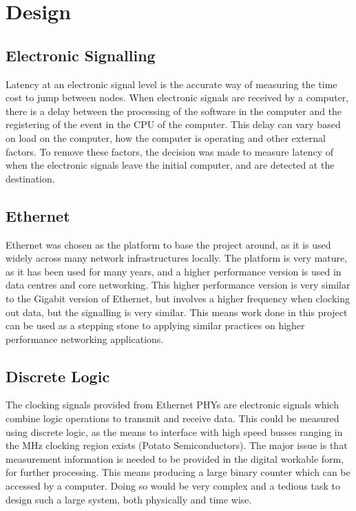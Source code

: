 \chapter{Design}\label{C:design}

\section{Electronic Signalling}

\par Latency at an electronic signal level is the accurate way of measuring the time cost to jump between nodes. 
When electronic signals are received by a computer, there is a delay between the processing of the software 
in the computer and the registering of the event in the CPU of the computer. This delay can vary based on load 
on the computer, how the computer is operating and other external factors. To remove these factors, the decision 
was made to measure latency of when the electronic signals leave the initial computer, and are detected at the 
destination.

\section{Ethernet}

Ethernet was chosen as the platform to base the project around, as it is used widely across many network 
infrastructures locally. The platform is very mature, as it has been used for many years, and a higher performance 
version is used in data centres and core networking. This higher performance version is very similar to the Gigabit 
version of Ethernet, but involves a higher frequency when clocking out data, but the signalling is very similar. 
This means work done in this project can be used as a stepping stone to applying similar practices on higher 
performance networking applications.

\section{Discrete Logic}

The clocking signals provided from Ethernet PHYs are electronic signals which combine logic operations to transmit 
and receive data. This could be measured using discrete logic, as the means to interface with high speed busses 
ranging in the MHz clocking region exists (Potato Semiconductors). The major issue is that measurement information 
is needed to be provided in the digital workable form, for further processing.  This means producing a large binary 
counter which can be accessed by a computer. Doing so would be very complex and a tedious task to design such a 
large system, both physically and time wise.

